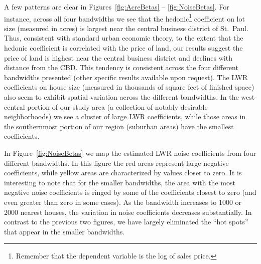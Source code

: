 \documentclass{article}\usepackage{graphicx, color}
\begin{document}
A few patterns are clear in Figures~\ref{fig:AcreBetas} -- \ref{fig:NoiseBetas}. For instance, across all four bandwidths we see that the hedonic\footnote{Remember that the dependent variable is the log of sales price.} coefficient on lot size (measured in acres) is largest near the central business district of St.\ Paul. Thus, consistent with standard urban economic theory, to the extent that the hedonic coefficient is correlated with the price of land, our results suggest the price of land is highest near the central business district and declines with distance from the CBD. This tendency is consistent across the four different bandwidths presented (other specific results available upon request). The LWR coefficients on house size (measured in thousands of square feet of finished space) also seem to exhibit spatial variation across the different bandwidths. In the west-central portion of our study area (a collection of notably desirable neighborhoods) we see a cluster of large LWR coefficients, while those areas in the southernmost portion of our region (suburban areas) have the smallest coefficients. 

In Figure~\ref{fig:NoiseBetas} we map the estimated LWR noise coefficients from four different bandwidths. In this figure the red areas represent large negative coefficients, while yellow areas are characterized by values closer to zero. It is interesting to note that for the smaller bandwidths, the area with the most negative noise coefficients is ringed by some of the coefficients closest to zero (and even greater than zero in some cases). As the bandwidth increases to 1000 or 2000 nearest houses, the variation in noise coefficients decreases substantially. In contrast to the previous two figures, we have largely eliminated the ``hot spots'' that appear in the smaller bandwidths. 
\end{document}
